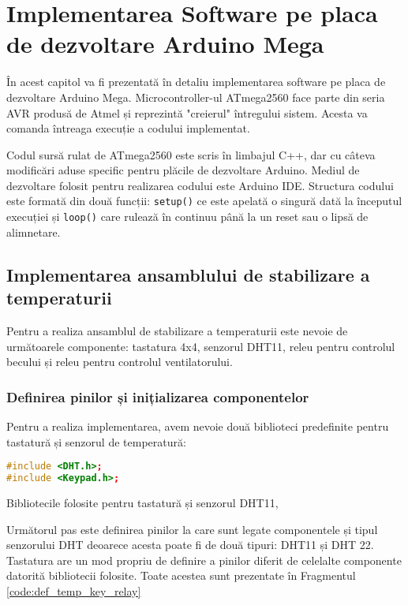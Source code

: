 \chapter{Implementarea Software pe placa de dezvoltare Arduino Mega}
\thispagestyle{pagestyle}
În acest capitol va fi prezentată în detaliu implementarea software pe placa de dezvoltare Arduino Mega. Microcontroller-ul ATmega2560 face parte din seria AVR produsă de Atmel și reprezintă "creierul" întregului sistem. Acesta va comanda întreaga execuție a codului implementat.

Codul sursă rulat de ATmega2560 este scris în limbajul C++, dar cu câteva modificări aduse specific pentru plăcile de dezvoltare Arduino. Mediul de dezvoltare folosit pentru realizarea codului este Arduino IDE\cite{arduino_ide}. Structura codului este formată din două funcții: \texttt{setup()} ce este apelată o singură dată la începutul execuției și \texttt{loop()} care rulează în continuu până la un reset sau o lipsă de alimnetare.


\section{Implementarea ansamblului de stabilizare a temperaturii}

Pentru a realiza ansamblul de stabilizare a temperaturii este nevoie de următoarele componente: tastatura 4x4, senzorul DHT11, releu pentru controlul becului și releu pentru controlul ventilatorului.

\subsection{Definirea pinilor și inițializarea componentelor}
Pentru a realiza implementarea, avem nevoie două biblioteci predefinite pentru tastatură și senzorul de temperatură:
\begin{code}[H]
\begin{lstlisting}[language=C++]
#include <DHT.h>;
#include <Keypad.h>;
\end{lstlisting}
\caption{Bibliotecile folosite pentru tastatură și senzorul DHT11\cite{lib_key},\cite{lib_dht}}
\label{code:bib_key_dht}
\end{code}

Următorul pas este definirea pinilor la care sunt legate componentele și tipul senzorului DHT deoarece acesta poate fi de două tipuri: DHT11 și DHT 22. Tastatura are un mod propriu de definire a pinilor diferit de celelalte componente datorită bibliotecii folosite. Toate acestea sunt prezentate în Fragmentul \ref{code:def_temp_key_relay}

